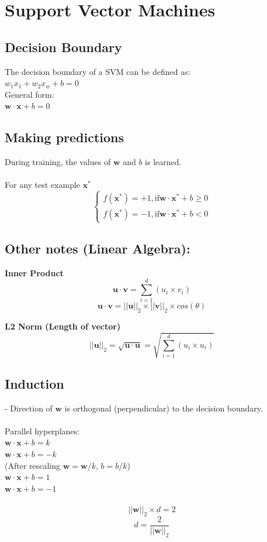 \section{Support Vector Machines}
\subsection*{Decision Boundary}
The decision boundary of a SVM can be defined as:\\
$w_1x_1 + w_2x_w + b = 0$\\
General form:\\
$\mathbf{w}\cdot\mathbf{x} + b = 0$\\
\subsection*{Making predictions}
During training, the values of $\mathbf{w}$ and $b$ is learned.\\\\
For any test example $\mathbf{x}^*$\\
\[\begin{cases}
    f(\mathbf{x}^*) = +1, \text{if} \mathbf{w}\cdot\mathbf{x}^*+b\geq0\\
    f(\mathbf{x}^*) = -1, \text{if} \mathbf{w}\cdot\mathbf{x}^*+b<0
\end{cases}\]
\subsection*{Other notes (Linear Algebra):}
\textbf{Inner Product}\\
\[\mathbf{u} \cdot \mathbf{v} = \sum^{d}_{i=1}(u_i\times v_i) \]
\[\mathbf{u} \cdot \mathbf{v} = ||\mathbf{u}||_2\times||\mathbf{v}||_2\times cos(\theta) \]

\textbf{L2 Norm (Length of vector)}
\[||\mathbf{u}||_2 = \sqrt{\mathbf{u}\cdot\mathbf{u}} = \sqrt{\sum^{d}_{i=1}(u_i\times u_i)} \]
\subsection*{Induction}
- Direction of $\mathbf{w}$ is orthogonal (perpendicular) to the decision boundary.\\\\
Parallel hyperplanes:\\
$\mathbf{w}\cdot\mathbf{x} + b = k$\\
$\mathbf{w}\cdot\mathbf{x} + b = -k$\\
(After rescaling $\mathbf{w} = \mathbf{w}/k$, $b = b/k$)\\
$\mathbf{w}\cdot\mathbf{x} + b = 1$\\
$\mathbf{w}\cdot\mathbf{x} + b = -1$\\\\
\[||\mathbf{w}||_2 \times d = 2\]
\[d=\frac{2}{||\mathbf{w}||_2}\]
